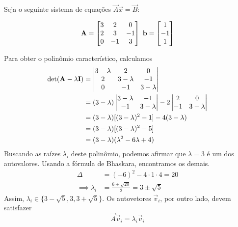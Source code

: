 \documentclass{homework}
\begin{document}
	\quest%
		Seja o seguinte sistema de equações $\vec{A} \vec{x} = \vec{B}$:
	
		$$
		\vec{A} = \left[\begin{array}{@{}ccc@{}}
		 3 &  2 &  0 \\
		 2 &  3 & -1 \\
		 0 & -1 &  3
		\end{array}\right]
		~
		\vec{b} = \left[\begin{array}{@{}c@{}}
		 1 \\
		-1 \\
		 1 
		\end{array}\right]
		$$
	
		\subsubquest Para obter o polinômio característico, calculamos
			\begin{align*}
				\det (\vec{A} - \lambda \vec{I}) &= \left|\begin{array}{@{}ccc@{}}
				3 - \lambda &  2 &  0 \\
				2 & 3 - \lambda & -1 \\
				0 & -1 & 3 - \lambda
				\end{array}\right|\\
				&= (3 - \lambda) \left|\begin{array}{@{}cc@{}}
				3 - \lambda & -1 \\
				-1 & 3 - \lambda
				\end{array}\right| - 2 \left|\begin{array}{@{}cc@{}}
				 2 &  0 \\
				-1 & 3 - \lambda
				\end{array}\right|\\
				&= (3 - \lambda) [(3 - \lambda)^2 - 1] - 4 (3 - \lambda)\\
				&= (3 - \lambda) [(3 - \lambda)^2 - 5]\\
				&= (3 - \lambda) (\lambda^2 - 6\lambda + 4)\\
			\end{align*}
		Buscando as raízes $\lambda_i$ deste polinômio, podemos afirmar que $\lambda = 3$ é um dos autovalores. Usando a fórmula de Bhaskara, encontramos os demais.
			\begin{align*}
				\Delta &= (-6)^2 - 4 \cdot 1 \cdot 4 = 20\\
				\implies \lambda_i &= \frac{6 \pm \sqrt{20}}{2} = 3 \pm \sqrt{5}
			\end{align*}
		Assim, $\lambda_i \in \{3 - \sqrt{5}, 3, 3 + \sqrt{5}\}$. Os autovetores $\vec{v}_i$, por outro lado, devem satisfazer
			$$ \vec{A} \vec{v}_i = \lambda_i \vec{v}_i $$
\end{document}
